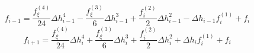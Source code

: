 \begin{equation} 
f_{{i-1}} = \frac{f^{{(4)}}_{{\xi}}}{24} \Delta h_{{i-1}}^{4} - \frac{f^{{(3)}}_{{\xi}}}{6} \Delta h_{{i-1}}^{3} + \frac{f^{{(2)}}_{i}}{2} \Delta h_{{i-1}}^{2} - \Delta h_{{i-1}} f^{{(1)}}_{i} + f_{i}
 \end{equation} 
\begin{equation} 
f_{{i+1}} = \frac{f^{{(4)}}_{{\xi}}}{24} \Delta h_{{i}}^{4} + \frac{f^{{(3)}}_{{\xi}}}{6} \Delta h_{{i}}^{3} + \frac{f^{{(2)}}_{i}}{2} \Delta h_{{i}}^{2} + \Delta h_{{i}} f^{{(1)}}_{i} + f_{i}
 \end{equation} 
